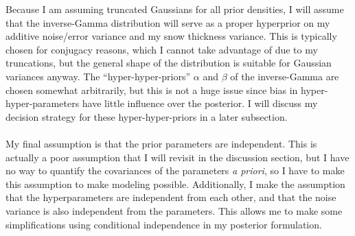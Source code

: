 \documentclass[12pt, letterpaper]{article}
\begin{document}
Because I am assuming truncated Gaussians for all prior densities, I will assume that the inverse-Gamma distribution will serve as a proper
hyperprior on my additive noise/error variance and my snow thickness variance. This is typically chosen for conjugacy reasons,
which I cannot take advantage of due to my truncations, but the general shape of the distribution is suitable for Gaussian variances anyway.
The ``hyper-hyper-priors'' $\alpha$ and  $\beta$ of the inverse-Gamma are chosen somewhat arbitrarily,
but this is not a huge issue since bias in hyper-hyper-parameters have little influence over the posterior. I will discuss my decision strategy
for these hyper-hyper-priors in a later subsection.
\\\\
My final assumption is that the prior parameters are independent. This is actually a poor assumption that I will revisit in the discussion section,
but I have no way to quantify the covariances of the parameters \emph{a priori}, so I have to make this assumption to make modeling possible.
Additionally, I make the assumption that the hyperparameters are independent from each other, and that the noise variance is also independent
from the parameters. This allows me to make some simplifications using conditional independence in my posterior formulation.
\end{document}
